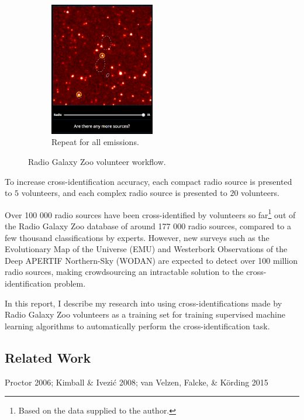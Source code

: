 \documentclass[a4paper]{article}
\begin{document}
\begin{figure}[!ht]
\begin{subfigure}{0.3\textwidth}
            \includegraphics[width=\linewidth, height=2.3in]{images/rgz_done.png}
            \caption{Repeat for all emissions.}
          \end{subfigure}
          \caption{Radio Galaxy Zoo volunteer workflow.}
          \label{fig:rgz}
      \end{figure}

      To increase cross-identification accuracy, each compact radio source is presented to $5$ volunteers, and each complex radio source is presented to $20$ volunteers\cite{banfield15}.

      Over 100 000 radio sources have been cross-identified by volunteers so far\footnote{Based on the data supplied to the author.} out of the Radio Galaxy Zoo database of around 177 000 radio sources, compared to a few thousand classifications by experts\cite{banfield15}. However, new surveys such as the Evolutionary Map of the Universe (EMU) \cite{norris11} and Westerbork Observations of the Deep APERTIF Northern-Sky (WODAN) \cite{röttgering11} are expected to detect over 100 million radio sources\cite{banfield15}, making crowdsourcing an intractable solution to the cross-identification problem.

      In this report, I describe my research into using cross-identifications made by Radio Galaxy Zoo volunteers as a training set for training supervised machine learning algorithms to automatically perform the cross-identification task.

    \subsection{Related Work}

      Proctor 2006\cite{proctor06}; Kimball \& Ivezić 2008; van Velzen, Falcke, \& Körding 2015
\end{document}
